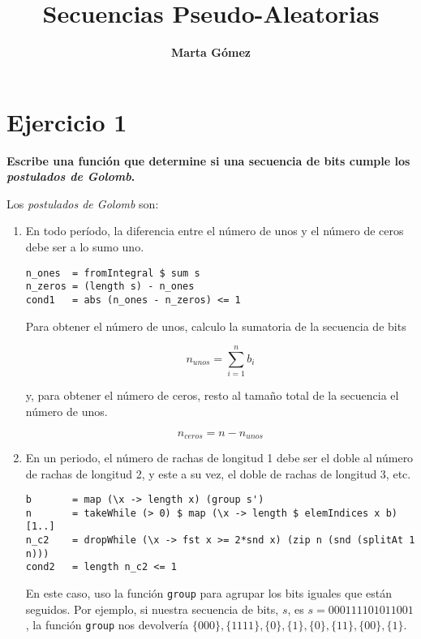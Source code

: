\documentclass[10pt,spanish]{article}
\title{\fontfamily{pag}\selectfont \bfseries \Huge \color{azul} Secuencias Pseudo-Aleatorias}
\author{\fontfamily{pag}\selectfont \bfseries \LARGE Marta Gómez}
\begin{document}
\maketitle

\renewcommand{\tablename}{Tabla}

\section{\textcolor{azul}Ejercicio 1}
\textbf{Escribe una función que determine si una secuencia de bits cumple los \textit{\textcolor{azul}{postulados de Golomb}}.}

Los \textit{\textcolor{azul}{postulados de Golomb}} son:

\begin{enumerate}[1.]
\item En todo período, la diferencia entre el número de unos y el número de ceros debe ser a lo sumo uno.

\begin{verbatim}
n_ones  = fromIntegral $ sum s
n_zeros = (length s) - n_ones
cond1   = abs (n_ones - n_zeros) <= 1
\end{verbatim}

Para obtener el número de unos, calculo la sumatoria de la secuencia de bits 

\begin{displaymath}
    n_{unos} = \sum_{i=1}^n b_i
\end{displaymath}

y, para obtener el número de ceros, resto al tamaño total de la secuencia el número de unos.

\begin{displaymath}
    n_{ceros} = n - n_{unos}
\end{displaymath}

\item En un periodo, el número de rachas de longitud 1 debe ser el doble al número de rachas de longitud 2, y este a su vez, el doble de rachas de longitud 3, etc.

\begin{verbatim}
b       = map (\x -> length x) (group s')
n       = takeWhile (> 0) $ map (\x -> length $ elemIndices x b) [1..]
n_c2    = dropWhile (\x -> fst x >= 2*snd x) (zip n (snd (splitAt 1 n))) 
cond2   = length n_c2 <= 1
\end{verbatim}

En este caso, uso la función \texttt{group} para agrupar los bits iguales que están seguidos. Por ejemplo, si nuestra secuencia de bits, $s$, es $s=000111101011001$, la función \texttt{group} nos devolvería $\{000\},\{1111\},\{0\},\{1\},\{0\},\{11\},\{00\},\{1\}$.



\end{enumerate}
\end{document}
